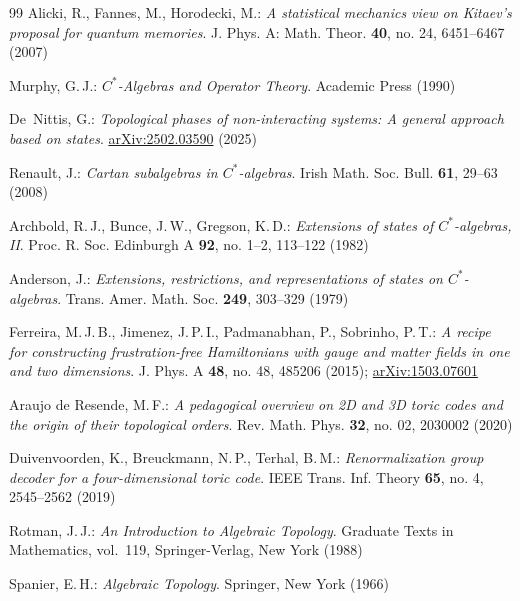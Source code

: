 \documentclass[a4paper,12pt,twoside,reqno]{amsart}
\theoremstyle{plain}
\theoremstyle{definition}
\theoremstyle{remark}
\numberwithin{equation}{section}
\numberwithin{figure}{section}
\numberwithin{table}{section}
\newcommand{\eprint}[1]{\href{https://arxiv.org/abs/#1}{arXiv:#1}}
\begin{document}
\begin{thebibliography}{99}
		Alicki, R., Fannes, M., Horodecki, M.:
		{\sl A statistical mechanics view on Kitaev's proposal for quantum memories}.
		J. Phys. A: Math. Theor. {\bf 40}, no. 24, 6451--6467 (2007)
		
		Murphy, G.\,J.:
		{\em $C^*$-Algebras and Operator Theory}.
		Academic Press (1990)
		
		De~Nittis, G.:
		{\sl Topological phases of non-interacting systems: A general approach based on states}.
		\eprint{2502.03590} (2025)
		
		Renault, J.:
		{\sl Cartan subalgebras in $C^*$-algebras}.
		Irish Math. Soc. Bull. {\bf 61}, 29--63 (2008)
		
		Archbold, R.\,J., Bunce, J.\,W., Gregson, K.\,D.:
		{\sl Extensions of states of $C^*$-algebras, II}.
		Proc. R. Soc. Edinburgh A {\bf 92}, no. 1--2, 113--122 (1982)
		
		Anderson, J.:
		{\sl Extensions, restrictions, and representations of states on $C^*$-algebras}.
		Trans. Amer. Math. Soc. {\bf 249}, 303--329 (1979)
		
		Ferreira, M.\,J.\,B., Jimenez, J.\,P.\,I., Padmanabhan, P., Sobrinho, P.\,T.:
		{\sl A recipe for constructing frustration-free Hamiltonians with gauge and matter fields in one and two dimensions}.
		J. Phys. A {\bf 48}, no. 48, 485206 (2015); \eprint{1503.07601}
		
		Araujo de Resende, M.\,F.:
		{\sl A pedagogical overview on 2D and 3D toric codes and the origin of their topological orders}.
		Rev. Math. Phys. {\bf 32}, no. 02, 2030002 (2020)
		
		Duivenvoorden, K., Breuckmann, N.\,P., Terhal, B.\,M.:
		{\sl Renormalization group decoder for a four-dimensional toric code}.
		IEEE Trans. Inf. Theory {\bf 65}, no. 4, 2545--2562 (2019)
		
		Rotman, J.\,J.:
		{\em An Introduction to Algebraic Topology}.
		Graduate Texts in Mathematics, vol.~119, Springer-Verlag, New York (1988)
		
		Spanier, E.\,H.:
		{\em Algebraic Topology}.
		Springer, New York (1966)
		
		
		
		
	\end{thebibliography}
	
\end{document}
